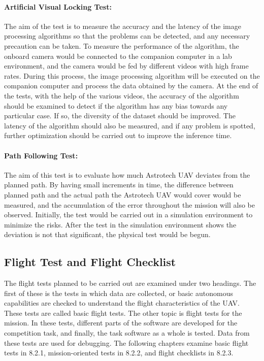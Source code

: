 \documentclass[12pt]{article}
\begin{document}
\paragraph*{Artificial Visual Locking Test:} The aim of the test is to measure the accuracy and the latency of the image processing algorithms so that the problems can be detected, and any necessary precaution can be taken. To measure the performance of the algorithm, the onboard camera would be connected to the companion computer in a lab environment, and the camera would be fed by different videos with high frame rates. During this process, the image processing algorithm will be executed on the companion computer and process the data obtained by the camera. At the end of the tests, with the help of the various videos, the accuracy of the algorithm should be examined to detect if the algorithm has any bias towards any particular case. If so, the diversity of the dataset should be improved. The latency of the algorithm should also be measured, and if any problem is spotted, further optimization should be carried out to improve the inference time. 

\paragraph*{Path Following Test:} The aim of this test is to evaluate how much Astrotech UAV deviates from the planned path. By having small increments in time, the difference between planned path and the actual path the Astrotech UAV would cover would be measured, and the accumulation of the error throughout the mission will also be observed. Initially, the test would be carried out in a simulation environment to minimize the risks. After the test in the simulation environment shows the deviation is not that significant, the physical test would be begun.


\subsection{Flight Test and Flight Checklist}
The flight tests planned to be carried out are examined under two headings. The first of these is the tests in which data are collected, or basic autonomous capabilities are checked to understand the flight characteristics of the UAV. These tests are called basic flight tests. The other topic is flight tests for the mission. In these tests, different parts of the software are developed for the competition task, and finally, the task software as a whole is tested. Data from these tests are used for debugging. The following chapters examine basic flight tests in 8.2.1, mission-oriented tests in 8.2.2, and flight checklists in 8.2.3.
\end{document}
